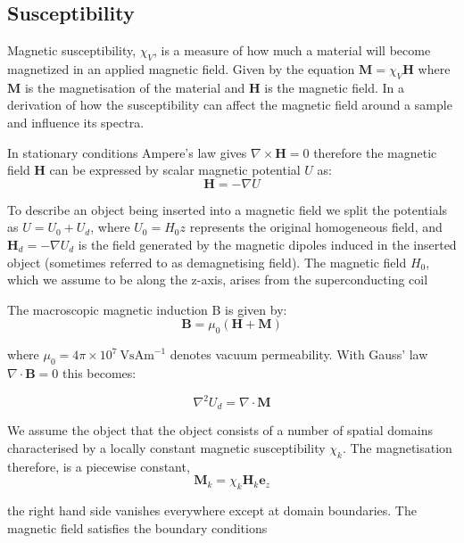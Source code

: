 \subsection{Susceptibility}

Magnetic susceptibility, $\chi_V$, is a measure of how much a material will become magnetized in an applied magnetic field. Given by the equation $\mathbf{M} = \chi_V \mathbf{H}$
where $\mathbf{M}$ is the magnetisation of the material and $\mathbf{H}$ is the magnetic field. In \citep{RN118} a derivation of
how the susceptibility can affect the magnetic field around a sample and influence its spectra.

In stationary conditions Ampere’s law gives $\nabla \times \mathbf{H} = 0$ therefore the magnetic field $\mathbf{H}$  can be expressed by scalar magnetic potential $U$ as:
\begin{equation}
\mathbf{H} = -\nabla U
\end{equation}

To describe an object being inserted into a magnetic field we split the potentials as $U = U_{0}  + U_{d}$, where $U_{0} = H_{0}z$ represents the original homogeneous field, and
$\mathbf{H}_d = - \nabla U_{d}$ is the field generated by the magnetic dipoles induced in the inserted object (sometimes referred to as demagnetising field). The magnetic field $H_{0}$, which we assume to be along the z-axis, arises from the superconducting coil

 The macroscopic magnetic induction B is given by:
\begin{equation}
  \mathbf{B} = \mu_{0}(\mathbf{H}+\mathbf{M})
\end{equation}

where $\mu_{0} = 4\pi\times10^{7}~\text{VsAm}^{-1}$ denotes vacuum permeability. With Gauss' law $\nabla \cdot \mathbf{B} = 0$ this becomes:

\begin{equation} \label{eqn1}
  \nabla^{2}U_{d} = \nabla \cdot \mathbf{M}
\end{equation}

We assume the object that the object consists of a number of spatial domains characterised by a
locally constant magnetic susceptibility $\chi_{k}$. The magnetisation therefore, is a piecewise
constant,
\begin{equation}
  \mathbf{M}_{k} = \chi_{k}\mathbf{H}_{k}\mathbf{e}_{z}
\end{equation}

the right hand side vanishes everywhere except at domain boundaries. The magnetic field satisfies the boundary conditions\citep{Jackson:2007uq}

